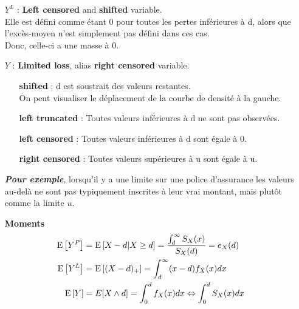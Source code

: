 \documentclass[french, landscape]{article}
\begin{document}
\begin{multicols*}{3}
\begin{itemize}
\item[$Y^L$ : ] 
	\textbf{Left censored} and \textbf{shifted} variable. \\ 
	Elle est défini comme étant 0 pour toutes les pertes inférieures à d, alors que l'excès-moyen n'est simplement pas défini dans ces cas. \\
	Donc, celle-ci a une masse à 0.


\item[$Y$ : ] 
	\textbf{Limited loss}, alias \textbf{right censored} variable. \\ 
	


	\begin{itemize}
		\item[\textbf{shifted} :] d est soustrait des valeurs restantes. \\
		On peut visualiser le déplacement de la courbe de densité à la gauche.
		\item[\textbf{left truncated} :] Toutes valeurs inférieures à d ne sont pas observées.			
		\item[\textbf{left censored} :] Toutes valeurs inférieures à d sont égale à 0.
		\item[\textbf{right censored} :] Toutes valeurs supérieures à u sont égale à u.
	\end{itemize}	
	\textbf{\textit{Pour exemple}}, lorsqu'il y a une limite sur une police d'assurance les valeurs au-delà ne sont pas typiquement inscrites à leur vrai montant, mais plutôt comme la limite $u$.
\end{itemize}


\begin{itemize}
\item[] \textbf{Moments}
\begin{align*}
	\mathrm{E} \left[ Y^P \right] &= \mathrm{E} \left[ X-d | X \geq d \right] = \frac{\int_{d}^{\infty} S_X(x)}{S_X(d)} = e_X(d) \\
	\mathrm{E} \left[ Y^L \right] &= \mathrm{E} \left[ (X - d)_+ \right] = \int_{d}^{\infty} (x - d) f_X(x) dx \\
	\mathrm{E} \left[ Y \right] &= E[X \wedge d] = \int_0^d f_X(x) dx \Leftrightarrow \int_0^d S_X(x) dx
\end{align*}


\end{itemize}
\end{multicols*}
\end{document}
